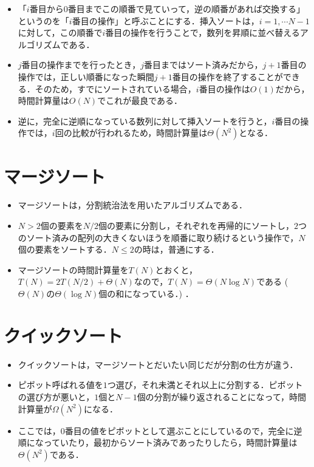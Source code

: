 \documentclass[slide,20pt]{ltjsarticle}
\begin{document}
\begin{itemize}
  \item 「$i$番目から$0$番目までこの順番で見ていって，逆の順番があれば交換する」というのを「$i$番目の操作」と呼ぶことにする．挿入ソートは，$i = 1, \cdots N - 1$に対して，この順番で$i$番目の操作を行うことで，数列を昇順に並べ替えるアルゴリズムである．
  \item $j$番目の操作までを行ったとき，$j$番目まではソート済みだから，$j + 1$番目の操作では，正しい順番になった瞬間$j + 1$番目の操作を終了することができる．そのため，すでにソートされている場合，$i$番目の操作は$O(1)$だから，時間計算量は$O(N)$でこれが最良である．
  \item 逆に，完全に逆順になっている数列に対して挿入ソートを行うと，$i$番目の操作では，$i$回の比較が行われるため，時間計算量は$\Theta(N ^ 2)$となる．
\end{itemize}

\section{マージソート}

\begin{itemize}
  \item マージソートは，分割統治法を用いたアルゴリズムである．
  \item $N > 2$個の要素を$N / 2$個の要素に分割し，それぞれを再帰的にソートし，$2$つのソート済みの配列の大きくないほうを順番に取り続けるという操作で，$N$個の要素をソートする．$N \le 2$の時は，普通にする．
  \item マージソートの時間計算量を$T(N)$とおくと，$T(N) = 2T(N / 2) + \Theta(N)$なので，$T(N) = \Theta(N \log N)$である ($\Theta(N)$の$\Theta(\log N)$個の和になっている．) ．
\end{itemize}

\section{クイックソート}

\begin{itemize}
  \item クイックソートは，マージソートとだいたい同じだが分割の仕方が違う．
  \item ピボット呼ばれる値を$1$つ選び，それ未満とそれ以上に分割する．ピボットの選び方が悪いと，$1$個と$N - 1$個の分割が繰り返されることになって，時間計算量が$\Omega(N ^ 2)$になる．
  \item ここでは，$0$番目の値をピボットとして選ぶことにしているので，完全に逆順になっていたり，最初からソート済みであったりしたら，時間計算量は$\Theta(N ^ 2)$である．
\end{itemize}
\end{document}
